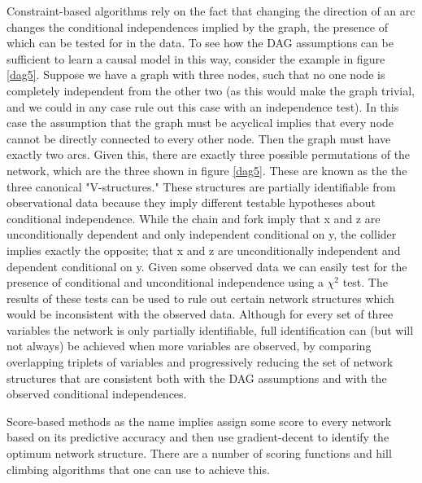 \documentclass{article}
\begin{document}
Constraint-based algorithms rely on the fact that changing the direction of an arc changes the conditional independences implied by the graph, the presence of which can be tested for in the data. To see how the DAG assumptions can be sufficient to learn a causal model in this way, consider the example in figure \ref{dag5}. Suppose we have a graph with three nodes, such that no one node is completely independent from the other two (as this would make the graph trivial, and we could in any case rule out this case with an independence test). In this case the assumption that the graph must be acyclical implies that every node cannot be directly connected to every other node. Then the graph must have exactly two arcs. Given this, there are exactly three possible permutations of the network, which are the three shown in figure \ref{dag5}. These are known as the the three canonical "V-structures." \parencite{pearl2014probabilistic} These structures are partially identifiable from observational data because they imply different testable hypotheses about conditional independence. While the chain and fork imply that x and z are unconditionally dependent and only independent conditional on y, the collider implies exactly the opposite; that x and z are unconditionally independent and dependent conditional on y. Given some observed data we can easily test for the presence of conditional and unconditional independence using a $\chi^2$ test. The results of these tests can be used to rule out certain network structures which would be inconsistent with the observed data. Although for every set of three variables the network is only partially identifiable, full identification can (but will not always) be achieved when more variables are observed, by comparing overlapping triplets of variables and progressively reducing the set of network structures that are consistent both with the DAG assumptions and with the observed conditional independences.

Score-based methods as the name implies assign some score to every network based on its predictive accuracy and then use gradient-decent to identify the optimum network structure. There are a number of scoring functions and hill climbing algorithms that one can use to achieve this. 
\end{document}
